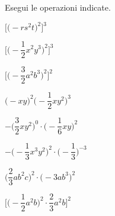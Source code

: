 \begin{esercizio}
 \label{ese:9.19}
 Esegui le operazioni indicate.
\begin{multicols}{2}
\begin{enumeratea}
\spazielenx
 \item \(\bigg[\big(-rs^{2}t\big)^{2}\bigg]^{3}\)
 \item \(\Bigg[\bigg(-{\dfrac{1}{2}}x^{2}y^{3}\bigg)^{2}\Bigg]^{3}\)
 \item \(\Bigg[\bigg(-{\dfrac{3}{2}}a^{2}b^{3}\bigg)^{2}\Bigg]^{2}\)
 \item \(\big(-xy\big)^{2}\bigg(-{\dfrac{1}{2}}xy^{2}\bigg)^{3}\)
 \item 
\(-\bigg(\dfrac{3}{2}xy^{2}\bigg)^{0}\cdot\bigg(-{\dfrac{1}{6}}xy\bigg)^{2}\)
 \item 
\(-\bigg(-{\dfrac{1}{3}}x^{3}y^{2}\bigg)^{2}\cdot
\bigg(-{\dfrac{1}{3}}\bigg)^{-3}\)
 \item \(\bigg(\dfrac{2}{3}ab^{2}c\bigg)^{2}\cdot\big(-3ab^{3}\big)^{2}\)
 \item 
\(\Bigg[\bigg(-{\dfrac{1}{2}}a^{2}b\bigg)^{2}\cdot{\dfrac{2}{3}a^{2}b}\Bigg]^{2}\)
\end{enumeratea}
\end{multicols}
\end{esercizio}

\subsubsection*{}

